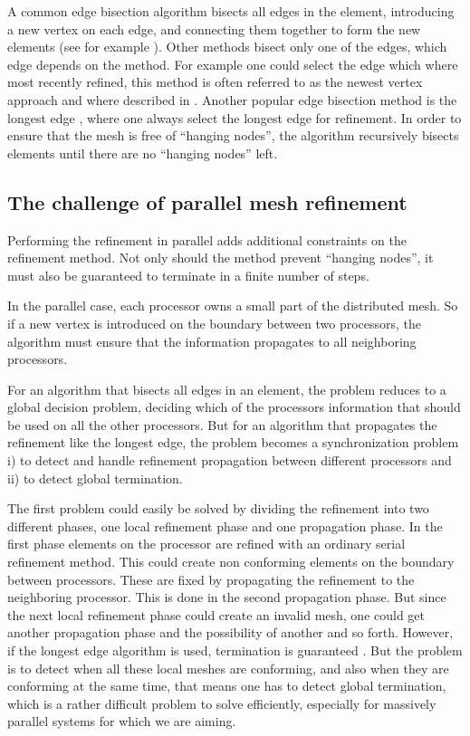 A common edge bisection algorithm bisects all edges in the element,
introducing a new vertex on each edge, and connecting them together to
form the new elements (see for example \cite{Bey1995a}). Other methods
bisect only one of the edges, which edge depends on the method. For
example one could select the edge which where most recently refined,
this method is often referred to as the newest vertex approach and
where described in \cite{Ebe1991a}. Another popular edge bisection
method is the longest edge \cite{Riv1984a}, where one always select
the longest edge for refinement. In order to ensure that the mesh is
free of ``hanging nodes'', the algorithm recursively bisects elements
until there are no ``hanging nodes'' left.

\subsection{The challenge of parallel mesh refinement}

Performing the refinement in parallel adds additional constraints on
the refinement method. Not only should the method prevent ``hanging
nodes'', it must also be guaranteed to terminate in a finite number of
steps.

In the parallel case, each processor owns a small part of the
distributed mesh. So if a new vertex is introduced on the boundary
between two processors, the algorithm must ensure that the information
propagates to all neighboring processors.

For an algorithm that bisects all edges in an element, the problem
reduces to a global decision problem, deciding which of the processors
information that should be used on all the other processors. But for
an algorithm that propagates the refinement like the longest edge, the
problem becomes a synchronization problem i) to detect and handle
refinement propagation between different processors and ii) to detect
global termination.

The first problem could easily be solved by dividing the refinement
into two different phases, one local refinement phase and one
propagation phase. In the first phase elements on the processor are
refined with an ordinary serial refinement method. This could create
non conforming elements on the boundary between processors. These are
fixed by propagating the refinement to the neighboring processor. This
is done in the second propagation phase. But since the next local
refinement phase could create an invalid mesh, one could get another
propagation phase and the possibility of another and so
forth. However, if the longest edge algorithm is used, termination is
guaranteed \cite{CasSav1999a}. But the problem is to detect when all
these local meshes are conforming, and also when they are conforming
at the same time, that means one has to detect global termination,
which is a rather difficult problem to solve efficiently, especially
for massively parallel systems for which we are aiming.

